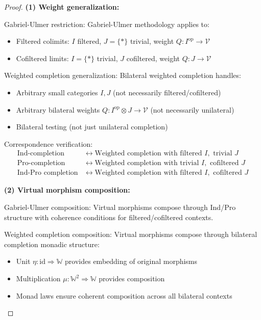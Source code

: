 \documentclass[11pt]{article}
\theoremstyle{plain}
\theoremstyle{definition}
\theoremstyle{remark}
\newcommand{\V}{\mathcal{V}}
\newcommand{\op}{\mathrm{op}}
\begin{document}
\begin{proof}
\textbf{(1) Weight generalization:}

Gabriel-Ulmer restriction: Gabriel-Ulmer methodology applies to:
\begin{itemize}
\item Filtered colimits: $I$ filtered, $J = \{\ast\}$ trivial, weight $Q : I^{\op} \to \V$ 
\item Cofiltered limits: $I = \{\ast\}$ trivial, $J$ cofiltered, weight $Q : J \to \V$
\end{itemize}

Weighted completion generalization: Bilateral weighted completion handles:
\begin{itemize}
\item Arbitrary small categories $I, J$ (not necessarily filtered/cofiltered)
\item Arbitrary bilateral weights $Q : I^{\op} \otimes J \to \V$ (not necessarily unilateral)
\item Bilateral testing (not just unilateral completion)
\end{itemize}

Correspondence verification:
\begin{align}
\text{Ind-completion} &\leftrightarrow \text{Weighted completion with filtered } I, \text{ trivial } J \\
\text{Pro-completion} &\leftrightarrow \text{Weighted completion with trivial } I, \text{ cofiltered } J \\
\text{Ind-Pro completion} &\leftrightarrow \text{Weighted completion with filtered } I, \text{ cofiltered } J
\end{align}

\textbf{(2) Virtual morphism composition:}

Gabriel-Ulmer composition: Virtual morphisms compose through Ind/Pro structure with coherence conditions for filtered/cofiltered contexts.

Weighted completion composition: Virtual morphisms compose through bilateral completion monadic structure:
\begin{itemize}
\item Unit $\eta : \text{id} \Rightarrow \mathbb{W}$ provides embedding of original morphisms
\item Multiplication $\mu : \mathbb{W}^2 \Rightarrow \mathbb{W}$ provides composition
\item Monad laws ensure coherent composition across all bilateral contexts
\end{itemize}


\end{proof}
\end{document}
